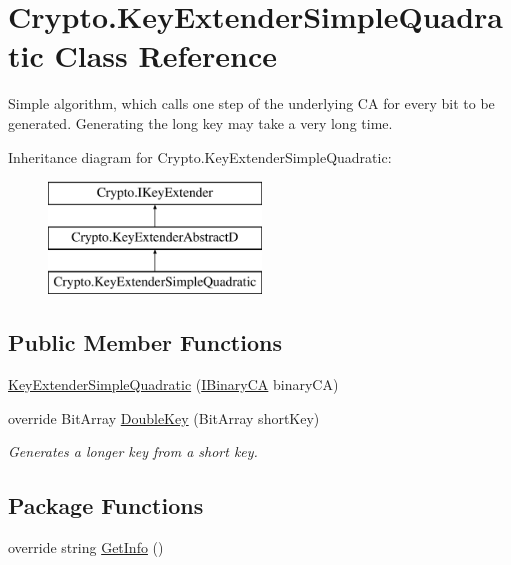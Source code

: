 \hypertarget{class_crypto_1_1_key_extender_simple_quadratic}{}\section{Crypto.\+Key\+Extender\+Simple\+Quadratic Class Reference}
\label{class_crypto_1_1_key_extender_simple_quadratic}


Simple algorithm, which calls one step of the underlying C\+A for every bit to be generated. Generating the long key may take a very long time.  


Inheritance diagram for Crypto.\+Key\+Extender\+Simple\+Quadratic\+:\begin{figure}[H]
\begin{center}
\leavevmode
\includegraphics[height=3.000000cm]{class_crypto_1_1_key_extender_simple_quadratic}
\end{center}
\end{figure}
\subsection*{Public Member Functions}
\begin{DoxyCompactItemize}
\item 
\hyperlink{class_crypto_1_1_key_extender_simple_quadratic_a2090b48093409cd09a18c56ac7ec7826}{Key\+Extender\+Simple\+Quadratic} (\hyperlink{interface_cellular_1_1_i_binary_c_a}{I\+Binary\+C\+A} binary\+C\+A)
\item 
override Bit\+Array \hyperlink{class_crypto_1_1_key_extender_simple_quadratic_a0bba7646011678850879c0685d18b379}{Double\+Key} (Bit\+Array short\+Key)
\begin{DoxyCompactList}\small\item\em Generates a longer key from a short key. \end{DoxyCompactList}\end{DoxyCompactItemize}
\subsection*{Package Functions}
\begin{DoxyCompactItemize}
\item 
override string \hyperlink{class_crypto_1_1_key_extender_simple_quadratic_a4a399b40cd1893acf4cc8531771657a0}{Get\+Info} ()
\end{DoxyCompactItemize}


